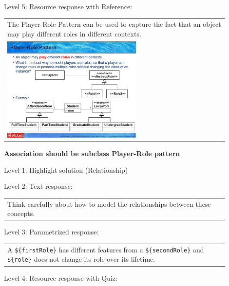 \noindent Level 5: Resource response with Reference: \medskip

\begin{tabular}{|p{0.9\linewidth}}
The Player-Role Pattern can be used to capture the fact that an object may play different roles
in different contexts.

\\
\includegraphics[width=0.6\textwidth]{images/player_role.png}
\end{tabular} \medskip


\noindent \textbf{Association should be subclass Player-Role pattern} \medskip

\noindent Level 1: Highlight solution (Relationship) \medskip

\noindent Level 2: Text response: \medskip

\begin{tabular}{|p{0.9\linewidth}}
Think carefully about how to model the relationships between these concepts.
\end{tabular} \medskip

\noindent Level 3: Parametrized response: \medskip

\begin{tabular}{|p{0.9\linewidth}}
A \verb|${firstRole}| has different features from a \verb|${secondRole}| and \verb|${role}| does not change its role over its lifetime.
\end{tabular} \medskip

\noindent Level 4: Resource response with Quiz: \medskip


